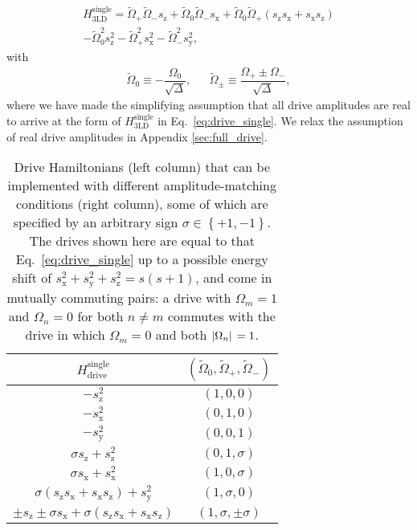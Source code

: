 \documentclass[nofootinbib,twocolumn]{revtex4-2}
\renewcommand{\t}{\text} %
\newcommand{\f}[2]{\dfrac{#1}{#2}} %
\newcommand{\p}[1]{\left(#1\right)} %
\renewcommand{\set}[1]{\left\{#1\right\}} %
\newcommand{\1}{\mathds{1}}
\newcommand{\x}{\text{x}}
\newcommand{\y}{\text{y}}
\newcommand{\z}{\text{z}}
\begin{document}
\begin{multline}
  H_{\t{3LD}}^{\t{single}}
  = \tilde\Omega_+ \tilde\Omega_- s_\z
  + \tilde\Omega_0 \tilde\Omega_- s_\x
  + \tilde\Omega_0 \tilde\Omega_+ \p{s_\z s_\x  + s_\x s_\z} \\
  - \tilde\Omega_0^2 s_\z^2 - \tilde\Omega_+^2 s_\x^2
  - \tilde\Omega_-^2 s_\y^2,
  \label{eq:drive_single}
\end{multline}
with
\begin{align}
  \tilde\Omega_0 \equiv -\f{\Omega_0}{\sqrt\Delta},
  &&
  \tilde\Omega_\pm \equiv \f{\Omega_+\pm\Omega_-}{\sqrt\Delta},
\end{align}
where we have made the simplifying assumption that all drive amplitudes are real to arrive at the form of $H_{\t{3LD}}^{\t{single}}$ in Eq.~\eqref{eq:drive_single}.
We relax the assumption of real drive amplitudes in Appendix \ref{sec:full_drive}.

\begin{table}
\centering
\caption{
Drive Hamiltonians (left column) that can be implemented with different amplitude-matching conditions (right column), some of which are specified by an arbitrary sign $\sigma\in\set{+1,-1}$.
The drives shown here are equal to that Eq.~\eqref{eq:drive_single} up to a possible energy shift of $s_\x^2+s_\y^2+s_\z^2=s(s+1)$, and come in mutually commuting pairs: a drive with $\Omega_m=1$ and $\Omega_n=0$ for both $n\ne m$ commutes with the drive in which $\Omega_m=0$ and both $\abs*{\Omega_n}=1$.
}
\vspace{.5em}
\begin{tabular}{c|c}
  $H_{\t{drive}}^{\t{single}}$
  & $(\tilde\Omega_0,\tilde\Omega_+,\tilde\Omega_-)$
  \\ \hline\hline
  $-s_\z^2$ & $\p{1,0,0}$
  \\ \hline
   $-s_\x^2$ & $\p{0,1,0}$
  \\ \hline
  $-s_\y^2$ & $\p{0,0,1}$
  \\ \hline
  $\sigma s_\z + s_\z^2$ & $\p{0,1,\sigma}$
  \\ \hline
  $\sigma s_\x + s_\x^2$ & $\p{1,0,\sigma}$
  \\ \hline
  $\sigma\p{s_\z s_\x+s_\x s_\z} + s_\y^2$ & $\p{1,\sigma,0}$
  \\ \hline
  $\pm s_\z \pm \sigma s_\x + \sigma \p{s_\z s_\x + s_\x s_\z}$
  & $\p{1,\sigma,\pm\sigma}$
\end{tabular}
\label{tab:drives}
\end{table}
\end{document}
